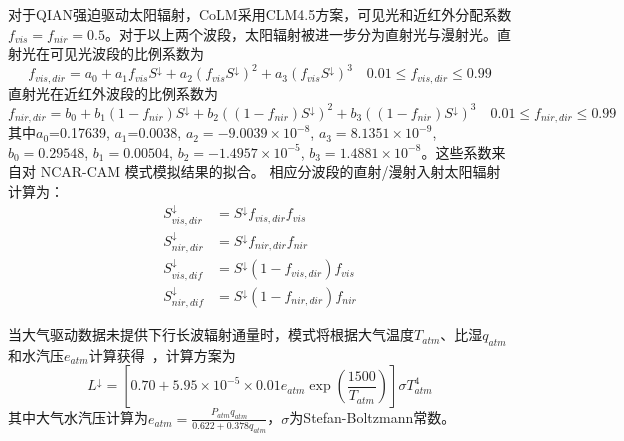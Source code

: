 对于QIAN强迫驱动太阳辐射，CoLM采用CLM4.5方案，可见光和近红外分配系数$f_{vis}=f_{nir}=0.5$。对于以上两个波段，太阳辐射被进一步分为直射光与漫射光。直射光在可见光波段的比例系数为
\begin{equation}\label{R_vis}
f_{vis,dir}=a_{0}+a_{1} f_{vis} S^{\downarrow}+a_{2}(f_{vis} S^{\downarrow})^{2}+a_{3}(f_{vis} S^{\downarrow})^{3} \quad 0.01 \leqslant f_{vis,dir} \leqslant 0.99
\end{equation}
直射光在近红外波段的比例系数为
\begin{equation}
f_{nir,dir}=b_{0}+b_{1}(1-f_{nir}) S^{\downarrow}+b_{2}((1-f_{nir}) S^{\downarrow})^{2}+b_{3}((1-f_{nir}) S^{\downarrow})^{3} \quad 0.01 \leqslant f_{nir,dir} \leqslant 0.99
\end{equation}
其中$a_0$=0.17639, $a_1$=0.0038, $a_2=-9.0039\times{10}^{-8}$, $a_3=8.1351\times10^{-9}$, $b_0=0.29548$, $b_1=0.00504$, $b_2=-1.4957\times10^{-5}$, $b_3=1.4881\times10^{-8}$。这些系数来自对 NCAR-CAM 模式模拟结果的拟合。
相应分波段的直射/漫射入射太阳辐射计算为：
%
\begin{equation}
\begin{aligned}
S_{vis,dir}^{\downarrow} &= S^{\downarrow}f_{vis,dir} f_{vis}\\
%
S_{nir,dir}^{\downarrow} &= S^{\downarrow}f_{nir,dir} f_{nir} \\
%
S_{vis,dif}^{\downarrow} &= S^{\downarrow}\left ( 1 - f_{vis,dir} \right ) f_{vis}\\
%
S_{nir,dif}^{\downarrow} &= S^{\downarrow}\left ( 1 - f_{nir,dir} \right ) f_{nir}
\end{aligned}
\end{equation}

当大气驱动数据未提供下行长波辐射通量时，模式将根据大气温度$T_{atm}$、比湿$q_{atm}$和水汽压$e_{atm}$计算获得~\citep{idso1981SetEquationsFull}，计算方案为
\begin{equation}\label{L_downarrow}
L ^\downarrow=\left[0.70+5.95 \times 10^{-5} \times 0.01 e_{a t m} \exp \left(\frac{1500}{T_{a t m}}\right)\right] \sigma T_{a t m}^{4}
\end{equation}
其中大气水汽压计算为$e_{a t m}=\frac{P_{a t m} q_{a t m}}{0.622+0.378 q_{a t m}}$，$\sigma$为Stefan-Boltzmann常数。

